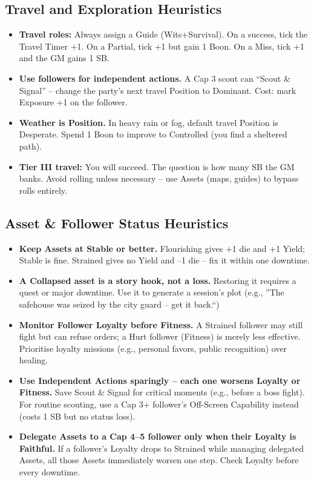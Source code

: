 \documentclass[11pt]{article}
\begin{document}
\subsection*{Travel and Exploration Heuristics}

\begin{itemize}
    \item \textbf{Travel roles:} Always assign a Guide (Wits+Survival). On a success, tick the Travel Timer +1. On a Partial, tick +1 but gain 1 Boon. On a Miss, tick +1 and the GM gains 1 SB.
    \item \textbf{Use followers for independent actions.} A Cap 3 scout can ``Scout \& Signal'' -- change the party's next travel Position to Dominant. Cost: mark Exposure +1 on the follower.
    \item \textbf{Weather is Position.} In heavy rain or fog, default travel Position is Desperate. Spend 1 Boon to improve to Controlled (you find a sheltered path).
    \item \textbf{Tier III travel:} You will succeed. The question is how many SB the GM banks. Avoid rolling unless necessary -- use Assets (maps, guides) to bypass rolls entirely.
\end{itemize}

\subsection*{Asset \& Follower Status Heuristics}
\begin{itemize}
  \item \textbf{Keep Assets at Stable or better.} Flourishing gives +1 die and +1 Yield; Stable is fine. Strained gives no Yield and --1 die -- fix it within one downtime.
  \item \textbf{A Collapsed asset is a story hook, not a loss.} Restoring it requires a quest or major downtime. Use it to generate a session's plot (e.g., ''The safehouse was seized by the city guard -- get it back.``)
  \item \textbf{Monitor Follower Loyalty before Fitness.} A Strained follower may still fight but can refuse orders; a Hurt follower (Fitness) is merely less effective. Prioritise loyalty missions (e.g., personal favors, public recognition) over healing.
  \item \textbf{Use Independent Actions sparingly -- each one worsens Loyalty or Fitness.} Save Scout \& Signal for critical moments (e.g., before a boss fight). For routine scouting, use a Cap 3+ follower's Off-Screen Capability instead (costs 1 SB but no status loss).
  \item \textbf{Delegate Assets to a Cap 4--5 follower only when their Loyalty is Faithful.} If a follower's Loyalty drops to Strained while managing delegated Assets, all those Assets immediately worsen one step. Check Loyalty before every downtime.
\end{itemize}
\end{document}
